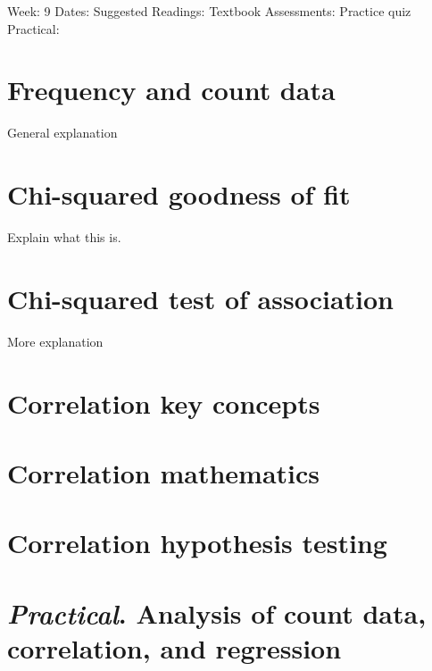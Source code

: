 \documentclass[
]{book}
\begin{document}
Week: 9
Dates:
Suggested Readings: Textbook
Assessments: Practice quiz
Practical:

\hypertarget{frequency-and-count-data}{%
\chapter{Frequency and count data}\label{frequency-and-count-data}}

General explanation

\hypertarget{chi-squared-goodness-of-fit}{%
\chapter{Chi-squared goodness of fit}\label{chi-squared-goodness-of-fit}}

Explain what this is.

\hypertarget{chi-squared-test-of-association}{%
\chapter{Chi-squared test of association}\label{chi-squared-test-of-association}}

More explanation

\hypertarget{correlation-key-concepts}{%
\chapter{Correlation key concepts}\label{correlation-key-concepts}}

\hypertarget{correlation-mathematics}{%
\chapter{Correlation mathematics}\label{correlation-mathematics}}

\hypertarget{correlation-hypothesis-testing}{%
\chapter{Correlation hypothesis testing}\label{correlation-hypothesis-testing}}

\hypertarget{practical.-analysis-of-count-data-correlation-and-regression}{%
\chapter{\texorpdfstring{\emph{Practical}. Analysis of count data, correlation, and regression}{Practical. Analysis of count data, correlation, and regression}}\label{practical.-analysis-of-count-data-correlation-and-regression}}
\end{document}
